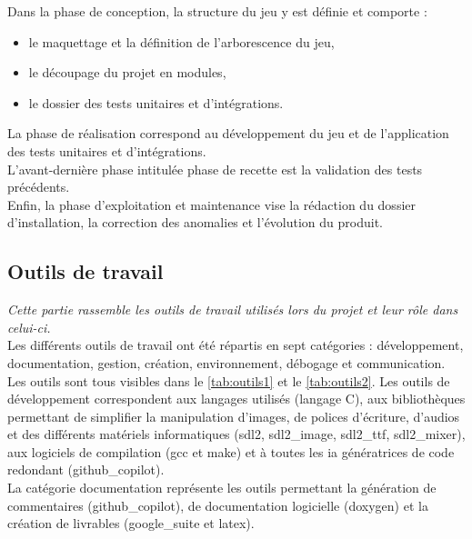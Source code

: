 \documentclass[11pt, a4paper]{article}
\begin{document}
    Dans la phase de conception, la structure du jeu y est définie et comporte :
    \begin{itemize}
            \item le maquettage et la définition de l'arborescence du jeu,
            \item le découpage du projet en modules,
            \item le dossier des tests unitaires et d'intégrations.\\
    \end{itemize}

    La phase de réalisation correspond au développement du jeu et de l'application des tests unitaires et d'intégrations.\\

    L'avant-dernière phase intitulée phase de recette est la validation des tests précédents.\\

    Enfin, la phase d'exploitation et maintenance vise la rédaction du dossier d'installation, la correction des anomalies et l'évolution du produit.
    
    \subsection{Outils de travail}
        \textit{Cette partie rassemble les outils de travail utilisés lors du projet et leur rôle dans celui-ci.}\\

        Les différents outils de travail ont été répartis en sept catégories : développement, documentation, gestion, création, environnement, débogage et communication. Les outils sont tous visibles dans le \autoref{tab:outils1} et le \autoref{tab:outils2}.
    Les outils de développement correspondent aux langages utilisés (langage C), aux bibliothèques permettant de simplifier la manipulation d'images, de polices d'écriture, d'audios et des différents matériels informatiques (\Gls{sdl2}, \Gls{sdl2_image}, \Gls{sdl2_ttf}, \Gls{sdl2_mixer}), aux logiciels de compilation (\Gls{gcc}\cite{bib_gcc} et \Gls{make}\cite{bib_make}) et à toutes les \acrshort{ia} génératrices de code redondant (\Gls{github_copilot}).\\
    
    La catégorie documentation représente les outils permettant la génération de commentaires (\Gls{github_copilot}), de documentation logicielle (\Gls{doxygen}) et la création de livrables (\Gls{google_suite} et \Gls{latex}).\\
    
\end{document}
